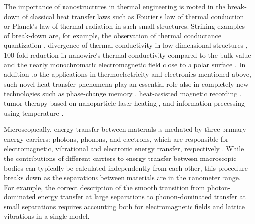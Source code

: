 The importance of nanostructures in thermal engineering is rooted in the break-down of classical heat transfer laws such as Fourier's law of thermal conduction \cite{fourier} or Planck's law of thermal radiation \cite{planck00a} in such small structures. Striking examples of break-down are, for example, the observation of thermal conductance quantization \cite{rego98,schwab00}, divergence of thermal conductivity in low-dimensional structures \cite{lepri97,lepri03,dhar08,xu14}, 100-fold reduction in nanowire's thermal conductivity compared to the bulk value \cite{hochbaum08} and the nearly monochromatic electromagnetic field close to a polar surface \cite{carminati99,shchegrov00}. In addition to the applications in thermoelectricity and electronics mentioned above, such novel heat transfer phenomena play an essential role also in completely new technologies such as phase-change memory \cite{lankhorst05}, heat-assisted magnetic recording \cite{pan09}, tumor therapy based on nanoparticle laser heating \cite{avedisian09}, and information processing using temperature \cite{li12_rmp}.  %

Microscopically, energy transfer between materials is mediated by three primary energy carriers: photons, phonons, and electrons, which are responsible for electromagnetic, vibrational and electronic energy transfer, respectively \cite{chen}. While the contributions of different carriers to energy transfer between macroscopic bodies can typically be calculated independently from each other, this procedure breaks down as the separations between materials are in the nanometer range. For example, the correct description of the smooth transition from photon-dominated energy transfer at large separations to phonon-dominated transfer at small separations \cite{xiong14,chiloyan15} requires accounting both for electromagnetic fields and lattice vibrations in a single model. 



